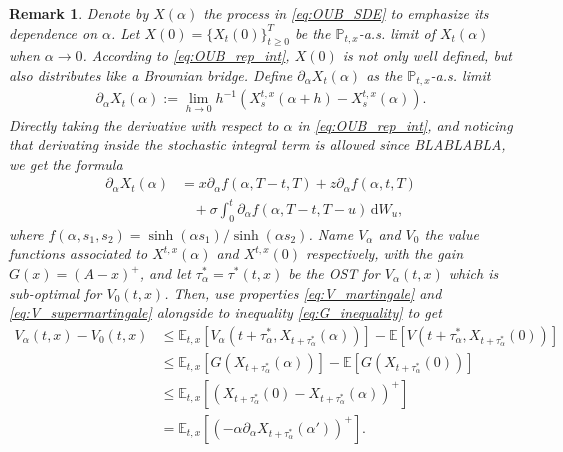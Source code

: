 \documentclass{tufte-handout}
\newcommand{\E}{\mathbb{E}} %
\renewcommand{\Pr}{\mathbb{P}} %
\newcommand{\dif}{\mathrm{d}}
\newtheorem{rmk}{Remark}
\begin{document}
	\begin{rmk}
		Denote by $X(\alpha)$ the process in \eqref{eq:OUB_SDE} to emphasize its dependence on $\alpha$. Let $X(0) = \{X_t(0)\}_{t\geq0}^T$ be the $\Pr_{t, x}$-a.s. limit of $X_t(\alpha)$ when $\alpha\rightarrow 0$. According to \eqref{eq:OUB_rep_int}, $X(0)$ is not only well defined, but also distributes like a Brownian bridge. Define $\partial_\alpha X_t(\alpha)$ as the $\Pr_{t, x}$-a.s. limit
		\begin{align*}
			\partial_\alpha X_t(\alpha) := \lim_{h\rightarrow 0}h^{-1}(X_s^{t, x}(\alpha + h) - X_s^{t, x}(\alpha)).
		\end{align*} 
		Directly taking the derivative with respect to $\alpha$ in \eqref{eq:OUB_rep_int}, and noticing that derivating inside the stochastic integral term is allowed since BLABLABLA, we get the formula
		\begin{align*}
			\partial_\alpha X_{t}(\alpha) &= x\partial_\alpha f(\alpha, T - t, T) + z\partial_\alpha f(\alpha, t, T) \\ &\ \ \ \ + \sigma\int_{0}^{t}\partial_\alpha f(\alpha, T - t, T - u)\,\dif W_u,
		\end{align*}
		where $f(\alpha, s_1, s_2) = \sinh(\alpha s_1)/\sinh(\alpha s_2)$. Name $V_\alpha$ and $V_0$ the value functions associated to $X^{t, x}(\alpha)$ and $X^{t, x}(0)$ respectively, with the gain $G(x) = (A - x)^+$, and let $\tau_\alpha^* = \tau^{*}(t, x)$ be the OST for $V_\alpha(t, x)$ which is sub-optimal for $V_0(t, x)$. Then, use properties \eqref{eq:V_martingale} and \eqref{eq:V_supermartingale} alongside to inequality \eqref{eq:G_inequality} to get
		\begin{align*}
			V_\alpha(t, x) - V_0(t, x) &\leq \E_{t, x}\left[V_\alpha\left(t + \tau_\alpha^*, X_{t + \tau_\alpha^*}(\alpha)\right)\right] - \E\left[V\left(t + \tau_\alpha^*, X_{t + \tau_\alpha^*}(0)\right)\right] \\
			&\leq \E_{t, x}\left[G\left(X_{t + \tau_\alpha^*}(\alpha)\right)\right] - \E\left[G\left(X_{t + \tau_\alpha^*}(0)\right)\right] \\
			&\leq \E_{t, x}\left[\left(X_{t + \tau_\alpha^*}(0) - X_{t + \tau_\alpha^*}(\alpha)\right)^+\right] \\
			&= \E_{t, x}\left[\left(-\alpha\partial_\alpha X_{t + \tau_\alpha^*}(\alpha')\right)^+\right].

\end{align*}
\end{rmk}
\end{document}
